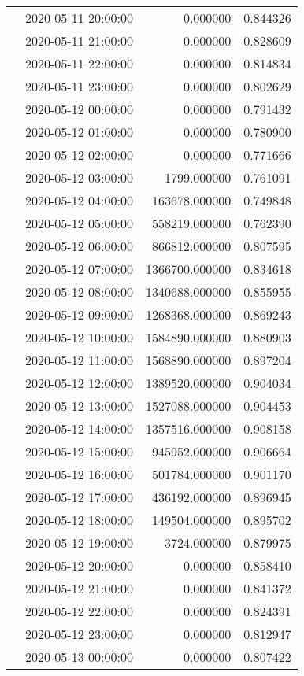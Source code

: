 \begin{tabular}{llrr}
 & 2020-05-11 20:00:00 & 0.000000 & 0.844326 \\
 & 2020-05-11 21:00:00 & 0.000000 & 0.828609 \\
 & 2020-05-11 22:00:00 & 0.000000 & 0.814834 \\
 & 2020-05-11 23:00:00 & 0.000000 & 0.802629 \\
 & 2020-05-12 00:00:00 & 0.000000 & 0.791432 \\
 & 2020-05-12 01:00:00 & 0.000000 & 0.780900 \\
 & 2020-05-12 02:00:00 & 0.000000 & 0.771666 \\
 & 2020-05-12 03:00:00 & 1799.000000 & 0.761091 \\
 & 2020-05-12 04:00:00 & 163678.000000 & 0.749848 \\
 & 2020-05-12 05:00:00 & 558219.000000 & 0.762390 \\
 & 2020-05-12 06:00:00 & 866812.000000 & 0.807595 \\
 & 2020-05-12 07:00:00 & 1366700.000000 & 0.834618 \\
 & 2020-05-12 08:00:00 & 1340688.000000 & 0.855955 \\
 & 2020-05-12 09:00:00 & 1268368.000000 & 0.869243 \\
 & 2020-05-12 10:00:00 & 1584890.000000 & 0.880903 \\
 & 2020-05-12 11:00:00 & 1568890.000000 & 0.897204 \\
 & 2020-05-12 12:00:00 & 1389520.000000 & 0.904034 \\
 & 2020-05-12 13:00:00 & 1527088.000000 & 0.904453 \\
 & 2020-05-12 14:00:00 & 1357516.000000 & 0.908158 \\
 & 2020-05-12 15:00:00 & 945952.000000 & 0.906664 \\
 & 2020-05-12 16:00:00 & 501784.000000 & 0.901170 \\
 & 2020-05-12 17:00:00 & 436192.000000 & 0.896945 \\
 & 2020-05-12 18:00:00 & 149504.000000 & 0.895702 \\
 & 2020-05-12 19:00:00 & 3724.000000 & 0.879975 \\
 & 2020-05-12 20:00:00 & 0.000000 & 0.858410 \\
 & 2020-05-12 21:00:00 & 0.000000 & 0.841372 \\
 & 2020-05-12 22:00:00 & 0.000000 & 0.824391 \\
 & 2020-05-12 23:00:00 & 0.000000 & 0.812947 \\
 & 2020-05-13 00:00:00 & 0.000000 & 0.807422 \\

\end{tabular}
